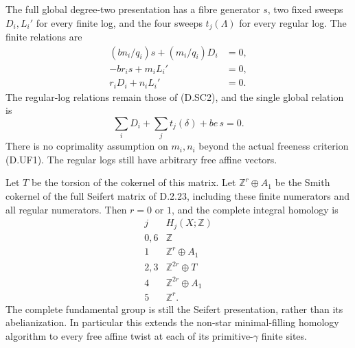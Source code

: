 The full global degree-two presentation has a fibre generator
$s$, two fixed sweeps $D_i,L_i'$ for every finite log, and the
four sweeps $t_j(\Lambda)$ for every regular log. The finite
relations are
\[
\begin{aligned}
 (bn_i/q_i)s+(m_i/q_i)D_i&=0,\\
 -br_i s+m_iL_i'&=0,\\
 r_iD_i+n_iL_i'&=0.
\end{aligned}                                                \tag{D.UF3}
\]
The regular-log relations remain those of (D.SC2), and the
single global relation is
\[
 \sum_iD_i+\sum_jt_j(\delta)+be\,s=0.                       \tag{D.UF4}
\]
There is no coprimality assumption on $m_i,n_i$ beyond the
actual freeness criterion (D.UF1). The regular logs still have
arbitrary free affine vectors.

Let $T$ be the torsion of the cokernel of this matrix. Let
$\mathbb Z^r\oplus A_1$ be the Smith cokernel of the full
Seifert matrix of D.2.23, including these finite numerators
and all regular numerators. Then $r=0$ or $1$, and the complete
integral homology is
\[
\begin{array}{c|c}
 j&H_j(X;\mathbb Z)\\\hline
0,6&\mathbb Z\\
1&\mathbb Z^r\oplus A_1\\
2,3&\mathbb Z^{2r}\oplus T\\
4&\mathbb Z^{2r}\oplus A_1\\
5&\mathbb Z^r.
\end{array}                                                  \tag{D.UF5}
\]
The complete fundamental group is still the Seifert
presentation, rather than its abelianization. In particular
this extends the non-star minimal-filling homology algorithm
to every free affine twist at each of its primitive-$\gamma$
finite sites.

